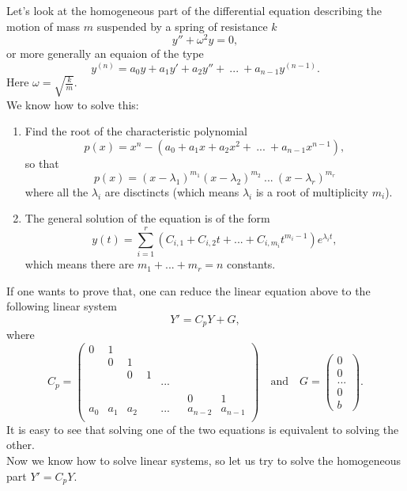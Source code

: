 \begin{itemize}
Let's look at the homogeneous part of the differential equation describing the motion of mass $m$ suspended by a spring of resistance $k$
\[y'' + \omega^2 y =0, \]
or more generally an equaion of the type
\[y^{(n)} = a_0 y + a_1 y' + a_2 y'' + \ ... \ + a_{n-1} y^{(n-1)}. \]
Here $\omega = \sqrt{\frac{k}{m}}$.\\

We know how to solve this:
\begin{enumerate}
\item Find the root of the characteristic polynomial
\[p (x) = x^n -(a_0 + a_1 x + a_2 x^2 + \ ... \ + a_{n-1} x^{n-1}) ,\]
so that \[p (x) = (x-\lambda_1)^{m_1} (x-\lambda_2)^{m_2} \ ... \ (x-\lambda_r)^{m_r}\]
where all the $\lambda_i$ are disctincts (which means $\lambda_i$ is a root of multiplicity $m_i$).
\item The general solution of the equation is of the form
\[y(t) =\sum_{i=1}^r (C_{i,1} +C_{i,2}t + ... + C_{i,m_i}t^{m_i -1}  ) e^{\lambda_i t},\]
which means there are $m_1+...+m_r = n$ constants.
\end{enumerate}

If one wants to prove that, one can reduce the linear equation above to the following linear system 
\[Y' = C_p Y +G,\]
where \[ C_p = \begin{pmatrix} 
0   & 1   &     &   & & & &         \\
    & 0   & 1   &   & & & &         \\
    &     & 0   & 1 & & & &         \\
    &     &     &   & ... & & &         \\
    &     &     &   & & & &         \\
    &     &     &   & & & 0 &  1       \\
a_0 & a_1 & a_2 &   & ... & & a_{n-2} & a_{n-1} \\

\end{pmatrix} \quad \text{and}\quad  G = \begin{pmatrix} 0 \\ 0 \\ ... \\ 0 \\ b\end{pmatrix}.\]
It is easy to see that solving one of the two equations is equivalent to solving the other.\\

Now we know how to solve linear systems, so let us try to solve the homogeneous part $Y' = C_p Y$.\\


\end{itemize}
